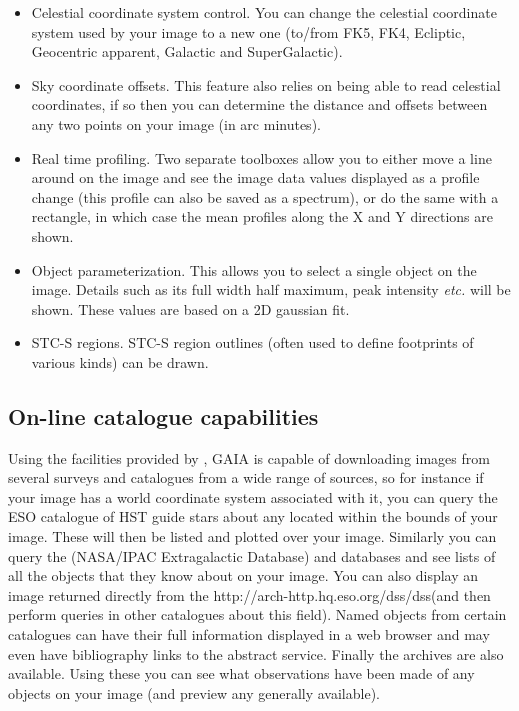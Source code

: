 \documentclass[twoside,11pt,nolof]{starlink}
\begin{document}
\begin{itemize}
\item Celestial coordinate system control. You can change the celestial
  coordinate system used by your image to a new one (to/from FK5,
  FK4, Ecliptic, Geocentric apparent, Galactic and SuperGalactic).

\item Sky coordinate offsets. This feature also relies on being
  able to read celestial coordinates, if so then you can
  determine the distance and offsets between any two points on
  your image (in arc minutes).

\item Real time profiling. Two separate toolboxes allow you to either
  move a line around on the image and see the image data values
  displayed as a profile change (this profile can also be saved as a
  spectrum), or do the same with a rectangle, in which case the mean
  profiles along the X and Y directions are shown.

\item Object parameterization. This allows you to select a single
  object on the image. Details such as its full width half
  maximum, peak intensity \emph{etc.} will be shown. These values are
  based on a 2D gaussian fit.

\item STC-S regions. STC-S region outlines (often used to define footprints of
  various kinds) can be drawn.

\end{itemize}

\subsection{On-line catalogue capabilities}

Using the facilities provided by
, GAIA is
capable of downloading images from several surveys and catalogues from a
wide range of sources, so for instance if your image has a world
coordinate system associated with it, you can query the ESO catalogue of
HST guide stars about any located within the bounds of your image. These
will then be listed and plotted over your image.  Similarly you can
query the
(NASA/IPAC Extragalactic Database) and
databases and see lists of all the objects that they know about on your
image. You can also display an image returned directly from the
{http://arch-http.hq.eso.org/dss/dss}(and then perform queries in other
catalogues about this field). Named objects from certain catalogues can
have their full information displayed in a web browser and may even have
bibliography links to the
 abstract
service.  Finally the
 archives
are also available. Using these you can see what observations have
been made of any objects on your image (and preview any generally
available).
\end{document}
